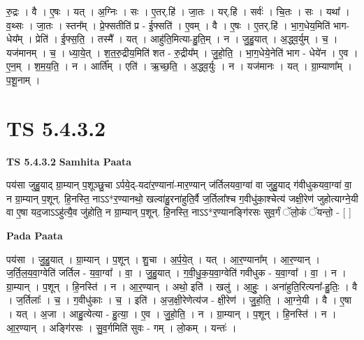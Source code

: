 \documentclass[17pt]{extarticle}
\begin{document}
रु॒द्रः । वै । ए॒षः । यत् । अ॒ग्निः । सः । ए॒तर्.हि॑ । जा॒तः । यर्.हि॑ । सर्वः॑ । चि॒तः । सः । यथा᳚ । व॒थ्सः । जा॒तः । स्तन᳚म् । प्रे॒फ्सतीति॑ प्र - ई॒फ्सति॑ । ए॒वम् । वै । ए॒षः । ए॒तर्.हि॑ । भा॒ग॒धेय॒मिति॑ भाग-धेय᳚म् । प्रेति॑ । ई॒फ्स॒ति॒ । तस्मै᳚ । यत् । आहु॑ति॒मित्या-हु॒ति॒म् । न । जु॒हु॒यात् । अ॒द्ध्व॒र्युम् । च॒ । यज॑मानम् । च॒ । ध्या॒ये॒त् । श॒त॒रु॒द्रीय॒मिति॑ शत - रु॒द्रीय᳚म् । जु॒हो॒ति॒ । भा॒ग॒धेये॒नेति॑ भाग - धेये॑न । ए॒व । ए॒न॒म् । श॒म॒य॒ति॒ । न । आर्ति᳚म् । एति॑ । ऋ॒च्छ॒ति॒ । अ॒द्ध्व॒र्युः । न । यज॑मानः । यत् । ग्रा॒म्याणा᳚म् । प॒शू॒नाम् ।  \newline





\section{ TS 5.4.3.2 }

\textbf{TS 5.4.3.2 } \newline
\textbf{Samhita Paata} \newline

पय॑सा जुहु॒याद् ग्रा॒म्यान् प॒शूञ्छु॒चा ऽर्पये॒द्-यदा॑र॒ण्याना॑-मार॒ण्यान् ज॑र्तिलयवा॒ग्वा॑ वा जुहु॒याद् ग॑वीधुकयवा॒ग्वा॑ वा॒ न ग्रा॒म्यान् प॒शून्. हि॒नस्ति॒ नाऽऽ*र॒ण्यानथो॒ खल्वा॑हु॒रना॑हुति॒र्वै ज॒र्तिला᳚श्च ग॒वीधु॑का॒श्चेत्य॑ जक्षी॒रेण॑ जुहोत्याग्ने॒यी वा ए॒षा यद॒जाऽऽहु॑त्यै॒व जु॑होति॒ न ग्रा॒म्यान् प॒शून्. हि॒नस्ति॒ नाऽऽ*र॒ण्यानङ्गि॑रसः सुव॒र्गं ॅलो॒कं ॅयन्तो॒ - [  ] \newline

\textbf{Pada Paata} \newline

पय॑सा । जु॒हु॒यात् । ग्रा॒म्यान् । प॒शून् । शु॒चा । अ॒र्प॒ये॒त् । यत् । आ॒र॒ण्याना᳚म् । आ॒र॒ण्यान् । ज॒र्ति॒ल॒य॒वा॒ग्वेति॑ जर्तिल - य॒वा॒ग्वा᳚ । वा॒ । जु॒हु॒यात् । ग॒वी॒धु॒क॒य॒वा॒ग्वेति॑ गवीधुक - य॒वा॒ग्वा᳚ । वा॒ । न । ग्रा॒म्यान् । प॒शून् । हि॒नस्ति॑ । न । आ॒र॒ण्यान् । अथो॒ इति॑ । खलु॑ । आ॒हुः॒ । अना॑हुति॒रित्यना᳚-हु॒तिः॒ । वै । ज॒र्तिलाः᳚ । च॒ । ग॒वीधु॑काः । च॒ । इति॑ । अ॒ज॒क्षी॒रेणेत्य॑ज - क्षी॒रेण॑ । जु॒हो॒ति॒ । आ॒ग्ने॒यी । वै । ए॒षा । यत् । अ॒जा । आहु॒त्येत्या - हु॒त्या॒ । ए॒व । जु॒हो॒ति॒ । न । ग्रा॒म्यान् । प॒शून् । हि॒नस्ति॑ । न । आ॒र॒ण्यान् । अङ्गि॑रसः । सु॒व॒र्गमिति॑ सुवः - गम् । लो॒कम् । यन्तः॑ ।  \newline




\end{document}
